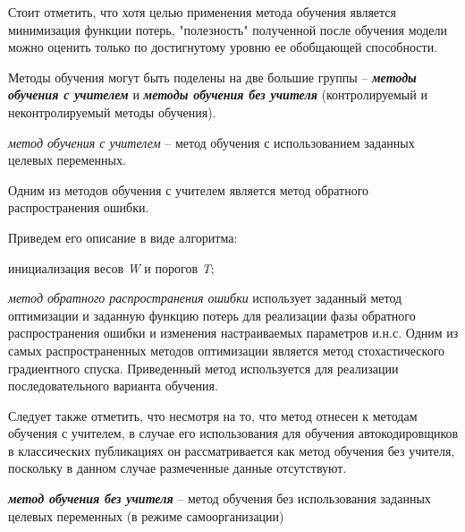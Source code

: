 Стоит отметить, что хотя целью применения метода обучения является минимизация функции потерь, "полезность"{} полученной после обучения модели можно оценить только по достигнутому уровню ее обобщающей способности.

Методы обучения могут быть поделены на две большие группы -- \textit{\textbf{методы обучения с учителем}} и \textit{\textbf{методы обучения без учителя}} (контролируемый и неконтролируемый методы обучения).

\textit{метод обучения с учителем} -- метод обучения с использованием заданных целевых переменных.

Одним из методов обучения с учителем является метод обратного распространения ошибки.

Приведем его описание в виде алгоритма:

\begin{algorithm}[H]
	инициализация весов \textit{W} и порогов \textit{T};\\
\end{algorithm}

\textit{метод обратного распространения ошибки} использует заданный метод оптимизации и заданную функцию потерь для реализации фазы обратного распространения ошибки и изменения настраиваемых параметров и.н.с. Одним из самых распространенных методов оптимизации является метод стохастического градиентного спуска. Приведенный метод используется для реализации последовательного варианта обучения.

Следует также отметить, что несмотря на то, что метод отнесен к методам обучения с учителем, в случае
его использования для обучения автокодировщиков в классических публикациях он рассматривается как
метод обучения без учителя, поскольку в данном случае размеченные данные отсутствуют.

\textbf{\textit{метод обучения без учителя}} -- метод обучения без использования заданных целевых переменных (в режиме самоорганизации)

